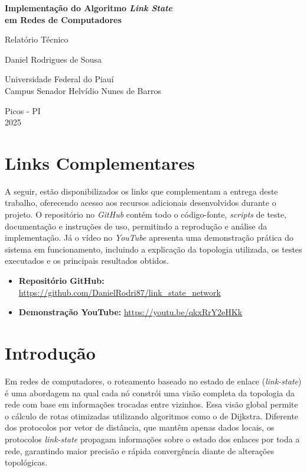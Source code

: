 \documentclass[12pt,a4paper]{report}
\begin{document}
\begin{titlepage}
\begin{center}
    \vspace*{2cm}
    {\Huge\textbf{Implementação do Algoritmo \textit{Link State}\\em Redes de Computadores}}
    
    \vspace{2cm}
    {\Large Relatório Técnico}
    
    \vspace{4cm}
    {\Large Daniel Rodrigues de Sousa}
    
    \vspace{1cm}
    {\large Universidade Federal do Piauí\\
    Campus Senador Helvídio Nunes de Barros}
    
    \vfill
    {\large Picos - PI\\
    2025}
\end{center}
\end{titlepage}

\chapter{Links Complementares}

A seguir, estão disponibilizados os links que complementam a entrega deste trabalho, oferecendo acesso aos recursos adicionais desenvolvidos durante o projeto. O repositório no \textit{GitHub} contém todo o código-fonte, \textit{scripts} de teste, documentação e instruções de uso, permitindo a reprodução e análise da implementação. Já o vídeo no \textit{YouTube} apresenta uma demonstração prática do sistema em funcionamento, incluindo a explicação da topologia utilizada, os testes executados e os principais resultados obtidos.

\begin{itemize}
    \item \textbf{Repositório GitHub:} \url{https://github.com/DanielRodri87/link_state_network}
    \item \textbf{Demonstração YouTube:} \url{https://youtu.be/qkxRrY2eHKk}
\end{itemize}

\chapter{Introdução}

Em redes de computadores, o roteamento baseado no estado de enlace (\textit{link-state}) é uma abordagem na qual cada nó constrói uma visão completa da topologia da rede com base em informações trocadas entre vizinhos. Essa visão global permite o cálculo de rotas otimizadas utilizando algoritmos como o de Dijkstra. Diferente dos protocolos por vetor de distância, que mantêm apenas dados locais, os protocolos \textit{link-state} propagam informações sobre o estado dos enlaces por toda a rede, garantindo maior precisão e rápida convergência diante de alterações topológicas.
\end{document}
